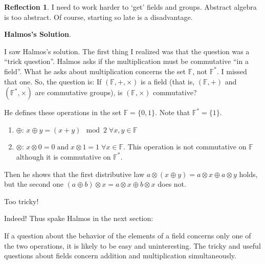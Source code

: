 \documentclass[english,notitlepage,smartquotes]{hgbreport}
\theoremstyle{definition}
\theoremstyle{definition}
\theoremstyle{remark}
\theoremstyle{definition}
\theoremstyle{plain}
\theoremstyle{definition}
\newtheorem{reflection}{Reflection}
\begin{document}
\begin{reflection}

I need to work harder to `get' fields and groups. Abstract algebra is too abstract. Of course, starting so late is a disadvantage.

\textbf{Halmos's Solution}.

I saw Halmos's solution. The first thing I realized was that the question was a ``trick question''. Halmos asks if the multiplication must be commutative ``in a field''. What he asks about multiplication concerns the set $\mathbb{F}$, not $\mathbb{F}^*$. I missed that one. So, the question is: If $(\mathbb{F},+,\times)$ is a field (that is, $(\mathbb{F},+)$ and $(\mathbb{F}^*,\times)$ are commutative groups), is $(\mathbb{F},\times)$ commutative?

He defines these operations in the set $\mathbb{F}=\{0,1\}$. Note that $\mathbb{F}^*=\{1\}$.
\begin{enumerate}
\item $\oplus$: $x\oplus y=(x+y) \mod 2\;\forall x,y\in\mathbb{F}$
\item $\otimes$: $x\otimes 0=0\;\text{and}\; x\otimes1=1\;\forall x\in\mathbb{F}$. This operation is not commutative on $\mathbb{F}$ although it is commutative on $\mathbb{F}^*$.
\end{enumerate}

Then he shows that the first distributive law $a\otimes(x\oplus y)  = a\otimes x\oplus a\otimes y$ holds, but the second one $(a\oplus b)\otimes x = a\otimes x\oplus b\otimes x$ does not.

Too tricky!

Indeed! Thus spake Halmos in the next section:
\begin{sidebar}
If a question about the behavior of the elements of a field concerns only one of the two operations, it is likely to be easy and uninteresting.  The tricky and useful questions about fields concern addition and multiplication simultaneously.
\end{sidebar}
\end{reflection}
\end{document}
